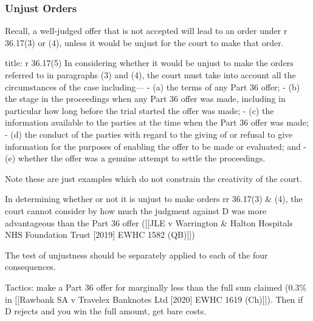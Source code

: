 \documentclass[
]{article}
\newenvironment{Shaded}{}{}
\newcommand{\NormalTok}[1]{#1}
\begin{document}
\hypertarget{unjust-orders}{%
\subsubsection{Unjust Orders}\label{unjust-orders}}

Recall, a well-judged offer that is not accepted will lead to an order
under r 36.17(3) or (4), unless it would be unjust for the court to make
that order.

\begin{Shaded}
\begin{Highlighting}[]
\NormalTok{title: r 36.17(5)}
\NormalTok{In considering whether it would be unjust to make the orders referred to in paragraphs (3) and (4), the court must take into account all the circumstances of the case including—}
\NormalTok{{-} (a) the terms of any Part 36 offer;}
\NormalTok{{-} (b) the stage in the proceedings when any Part 36 offer was made, including in particular how long before the trial started the offer was made;}
\NormalTok{{-} (c) the information available to the parties at the time when the Part 36 offer was made;}
\NormalTok{{-} (d) the conduct of the parties with regard to the giving of or refusal to give information for the purposes of enabling the offer to be made or evaluated; and}
\NormalTok{{-} (e) whether the offer was a genuine attempt to settle the proceedings.}
\end{Highlighting}
\end{Shaded}

Note these are just examples which do not constrain the creativity of
the court.

\begin{Shaded}
\begin{Highlighting}[]
\NormalTok{In determining whether or not it is unjust to make orders rr 36.17(3) \& (4), the court cannot consider by how much the judgment against D was more advantageous than the Part 36 offer ([[JLE v Warrington \& Halton Hospitals NHS Foundation Trust [2019] EWHC 1582 (QB)]])}
\end{Highlighting}
\end{Shaded}

The test of unjustness should be separately applied to each of the four
consequences.

Tactics: make a Part 36 offer for marginally less than the full sum
claimed (0.3\% in {[}{[}Rawbank SA v Travelex Banknotes Ltd {[}2020{]}
EWHC 1619 (Ch){]}{]}). Then if D rejects and you win the full amount,
get bare costs.
\end{document}
